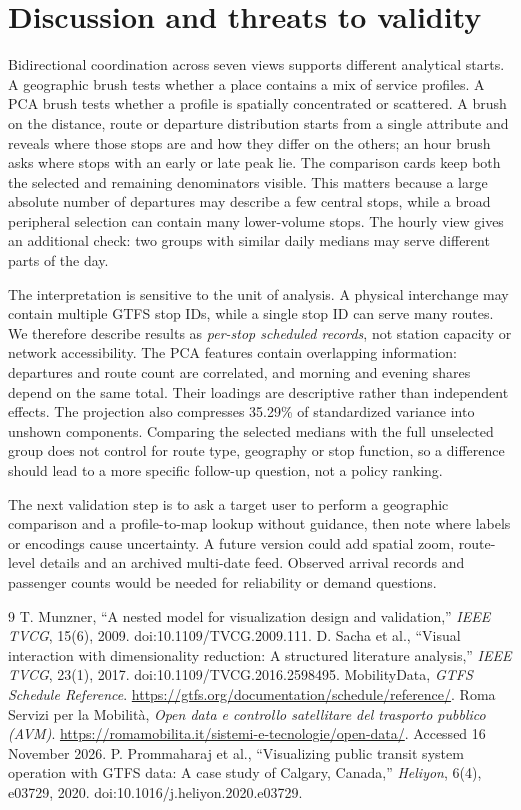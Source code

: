 \documentclass[10pt,a4paper]{article}
\begin{document}
\section{Discussion and threats to validity}
Bidirectional coordination across seven views supports different analytical starts. A geographic brush tests whether a place contains a mix of service profiles. A PCA brush tests whether a profile is spatially concentrated or scattered. A brush on the distance, route or departure distribution starts from a single attribute and reveals where those stops are and how they differ on the others; an hour brush asks where stops with an early or late peak lie. The comparison cards keep both the selected and remaining denominators visible. This matters because a large absolute number of departures may describe a few central stops, while a broad peripheral selection can contain many lower-volume stops. The hourly view gives an additional check: two groups with similar daily medians may serve different parts of the day.

The interpretation is sensitive to the unit of analysis. A physical interchange may contain multiple GTFS stop IDs, while a single stop ID can serve many routes. We therefore describe results as \emph{per-stop scheduled records}, not station capacity or network accessibility. The PCA features contain overlapping information: departures and route count are correlated, and morning and evening shares depend on the same total. Their loadings are descriptive rather than independent effects. The projection also compresses 35.29\% of standardized variance into unshown components. Comparing the selected medians with the full unselected group does not control for route type, geography or stop function, so a difference should lead to a more specific follow-up question, not a policy ranking.

The next validation step is to ask a target user to perform a geographic comparison and a profile-to-map lookup without guidance, then note where labels or encodings cause uncertainty. A future version could add spatial zoom, route-level details and an archived multi-date feed. Observed arrival records and passenger counts would be needed for reliability or demand questions.

\begin{thebibliography}{9}
 T. Munzner, ``A nested model for visualization design and validation,'' \emph{IEEE TVCG}, 15(6), 2009. doi:10.1109/TVCG.2009.111.
 D. Sacha et al., ``Visual interaction with dimensionality reduction: A structured literature analysis,'' \emph{IEEE TVCG}, 23(1), 2017. doi:10.1109/TVCG.2016.2598495.
 MobilityData, \emph{GTFS Schedule Reference}. \url{https://gtfs.org/documentation/schedule/reference/}.
 Roma Servizi per la Mobilit\`a, \emph{Open data e controllo satellitare del trasporto pubblico (AVM)}. \url{https://romamobilita.it/sistemi-e-tecnologie/open-data/}. Accessed 16 November 2026.
 P. Prommaharaj et al., ``Visualizing public transit system operation with GTFS data: A case study of Calgary, Canada,'' \emph{Heliyon}, 6(4), e03729, 2020. doi:10.1016/j.heliyon.2020.e03729.
\end{thebibliography}
\end{document}
